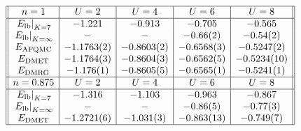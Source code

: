 \[
    \begin{array}{||c|c|c|c|c||}
        \hline n=1 & U=2 & U=4 & U=6 & U=8 \\
        \hline\left.E_{\mathrm{lb}}\right|_{K=7} & -1.221 & -0.913 & -0.705 & -0.565 \\
        \left.E_{\mathrm{lb}}\right|_{K=\infty} & - & - & -0.66(2) & -0.54(2) \\
        E_{\mathrm{AFQMC}} & -1.1763(2) & -0.8603(2) & -0.6568(3) & -0.5247(2) \\
        E_{\mathrm{DMET}} & -1.1764(3) & -0.8604(3) & -0.6562(5) & -0.5234(10) \\
        E_{\mathrm{DMRG}} & -1.176(1) & -0.8605(5) & -0.6565(1) & -0.5241(1) \\
        \hline n=0.875 & U=2 & U=4 & U=6 & U=8 \\
        \hline\left.E_{\mathrm{lb}}\right|_{K=7} & -1.316 & -1.103 & -0.963 & -0.867 \\
        \left.E_{\mathrm{lb}}\right|_{K=\infty} & - & - & -0.86(5) & -0.77(3) \\
        E_{\mathrm{DMET}} & -1.2721(6) & -1.031(3) & -0.863(13) & -0.749(7) \\
        \hline
        \end{array}
\]